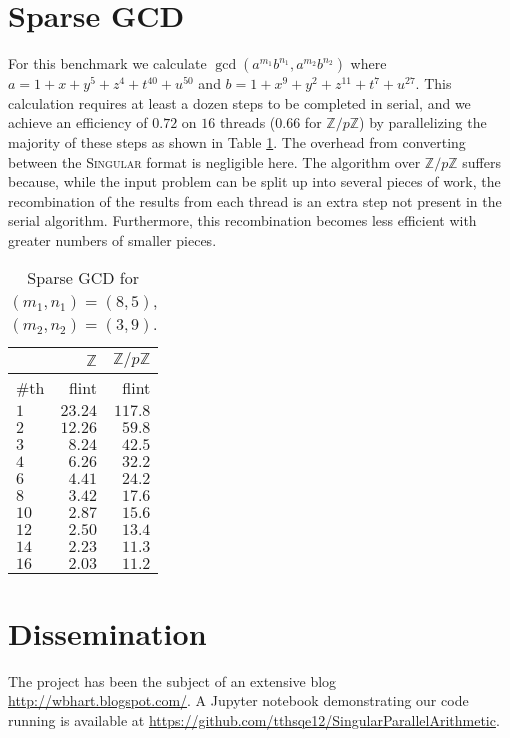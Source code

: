 \documentclass{deliverablereport}
\begin{document}
\section{Sparse GCD}
For this benchmark we calculate $\operatorname{gcd}(a^{m_1}b^{n_1}, a^{m_2}b^{n_2})$\text{,}
where $a=1+x+y^5+z^4+t^{40}+u^{50}$ and $b=1+x^9+y^2+z^{11}+t^7+u^{27}$. This calculation requires at least a dozen steps to be completed in serial, and we achieve an efficiency of $0.72$ on $16$ threads ($0.66$ for $\mathbb{Z}/p\mathbb{Z}$) by parallelizing the majority of these steps as shown in Table \ref{table_sparse_gcd}. The overhead from converting between the \textsc{Singular} format is negligible here. The algorithm over $\mathbb{Z}/p\mathbb{Z}$ suffers because, while the input problem can be split up into several pieces of work, the recombination of the results from each thread is an extra step not present in the serial algorithm. Furthermore, this recombination becomes less efficient with greater numbers of smaller pieces.
\begin{table}
\begin{tabular}{l | r | r | }
 & $\mathbb{Z}$ & $\mathbb{Z}/p \mathbb{Z}$ \\ \hline
\#th   & flint & flint\\ \hline
$1$   & $23.24$ & $117.8$ \\ \hline
$2$   & $12.26$ & $59.8$ \\ \hline
$3$   & $8.24$  & $42.5$ \\ \hline
$4$   & $6.26$  & $32.2$ \\ \hline
$6$   & $4.41$  & $24.2$ \\ \hline
$8$   & $3.42$  & $17.6$ \\ \hline
$10$  & $2.87$  & $15.6$ \\ \hline
$12$  & $2.50$  & $13.4$ \\ \hline
$14$  & $2.23$  & $11.3$ \\ \hline
$16$  & $2.03$  & $11.2$ \\ \hline
\end{tabular}
\caption{Sparse GCD for $(m_1, n_1) = (8, 5)$, $(m_2, n_2) = (3, 9)$.}
\label{table_sparse_gcd}
\end{table}

\section{Dissemination}

The project has been the subject of an extensive blog \url{http://wbhart.blogspot.com/}. A Jupyter notebook demonstrating our code running is available at \url{https://github.com/tthsqe12/SingularParallelArithmetic}.
\end{document}
